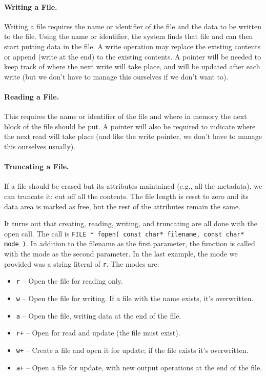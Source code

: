\paragraph{Writing a File.} Writing a file requires the name or identifier of the file and the data to be written to the file. Using the name or identifier, the system finds that file and can then start putting data in the file. A write operation may replace the existing contents or append (write at the end) to the existing contents. A pointer will be needed to keep track of where the next write will take place, and will be updated after each write (but we don't have to manage this ourselves if we don't want to).

\paragraph{Reading a File.} This requires the name or identifier of the file and where in memory the next block of the file should be put. A pointer will also be required to indicate where the next read will take place (and like the write pointer, we don't have to manage this ourselves usually). 

\paragraph{Truncating a File.} If a file should be erased but its attributes maintained (e.g., all the metadata), we can truncate it: cut off all the contents. The file length is reset to zero and its data area is marked as free, but the rest of the attributes remain the same.


It turns out that creating, reading, writing, and truncating are all done with the open call. The call is \texttt{FILE * fopen( const char* filename, const char* mode )}. In addition to the filename as the first parameter, the function is called with the mode as the second parameter. In the last example, the mode we provided was a string literal of \texttt{r}. The modes are:

\begin{itemize}
	\item \texttt{r} -- Open the file for reading only.
	\item \texttt{w} -- Open the file for writing. If a file with the name exists, it's overwritten.
	\item \texttt{a} -- Open the file, writing data at the end of the file.
	\item \texttt{r+} -- Open for read and update (the file must exist).
	\item \texttt{w+} -- Create a file and open it for update; if the file exists it's overwritten.
	\item \texttt{a+} -- Open a file for update, with new output operations at the end of the file.
\end{itemize}

